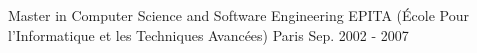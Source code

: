 
\begin{cventries}

  \cventry
    {Master in Computer Science and Software Engineering} %
    {EPITA (École Pour l'Informatique et les Techniques Avancées)} %
    {Paris} %
    {Sep. 2002 - 2007} %
    {} %

\end{cventries}

\vspace{-0.4cm}
